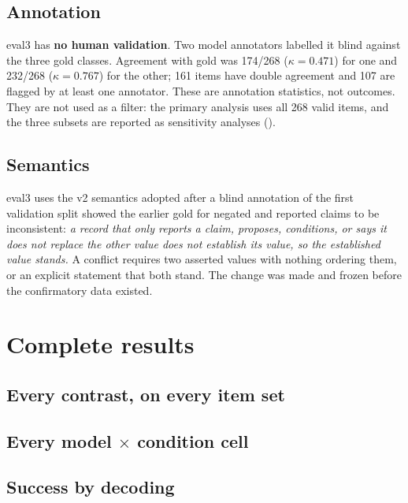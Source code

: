 \documentclass[10pt]{article}
\begin{document}
\subsection{Annotation}

eval3 has \textbf{no human validation}. Two model annotators labelled it blind against the three gold classes.
Agreement with gold was 174/268 ($\kappa=0.471$) for one and 232/268 ($\kappa=0.767$) for the other; 161 items
have double agreement and 107 are flagged by at least one annotator. These are annotation statistics, not
outcomes. They are not used as a filter: the primary analysis uses all 268 valid items, and the three subsets are
reported as sensitivity analyses ().

\subsection{Semantics}

eval3 uses the v2 semantics adopted after a blind annotation of the first validation split showed the earlier gold
for negated and reported claims to be inconsistent: \emph{a record that only reports a claim, proposes,
conditions, or says it does not replace the other value does not establish its value, so the established value
stands.} A conflict requires two asserted values with nothing ordering them, or an explicit statement that both
stand. The change was made and frozen before the confirmatory data existed.

\section{Complete results}

\subsection{Every contrast, on every item set}



\subsection{Every model \texorpdfstring{$\times$}{x} condition cell}



\subsection{Success by decoding}
\end{document}
